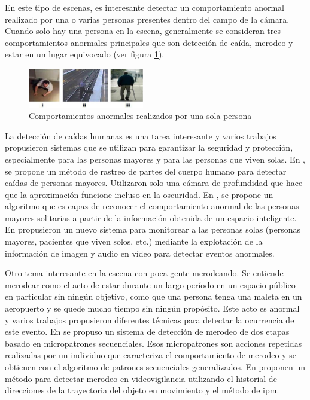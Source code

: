 En este tipo de escenas, es interesante detectar un comportamiento anormal realizado por una o varias personas presentes dentro del campo de la cámara. Cuando solo hay una persona en la escena, generalmente se consideran tres comportamientos anormales principales que son detección de caída, merodeo y estar en un lugar equivocado (ver figura \ref{fig:abnormal-behaviors-single-person}).

\begin{figure}[ht]
\centering
\includegraphics[width=0.45\textwidth]{img/chapters/estado-del-arte/Abnormal-behaviors-single-person.jpg}
\caption{\label{fig:abnormal-behaviors-single-person}Comportamientos anormales realizados por una sola persona}
\end{figure}

La detección de caídas humanas es una tarea interesante y varios trabajos propusieron sistemas que se utilizan para garantizar la seguridad y protección, especialmente para las personas mayores y para las personas que viven solas. En \cite{6804646}, se propone un método de rastreo de partes del cuerpo humano para detectar caídas de personas mayores. Utilizaron solo una cámara de profundidad que hace que la aproximación funcione incluso en la oscuridad. En \cite{HUANG2014125}, se propone un algoritmo que es capaz de reconocer el comportamiento anormal de las personas mayores solitarias a partir de la información obtenida de un espacio inteligente. En \cite{6916753} propusieron un nuevo sistema para monitorear a las personas solas (personas mayores, pacientes que viven solos, etc.) mediante la explotación de la información de imagen y audio en vídeo para detectar eventos anormales.

Otro tema interesante en la escena con poca gente merodeando. Se entiende merodear como el acto de estar durante un largo período en un espacio público en particular sin ningún objetivo, como que una persona tenga una maleta en un aeropuerto y se quede mucho tiempo sin ningún propósito. Este acto es anormal y varios trabajos propusieron diferentes técnicas para detectar la ocurrencia de este evento. En \cite{10.1007/978-3-319-18914-7_54} se propuso un sistema de detección de merodeo de dos etapas basado en micropatrones secuenciales. Esos micropatrones son acciones repetidas realizadas por un individuo que caracteriza el comportamiento de merodeo y se obtienen con el algoritmo de patrones secuenciales generalizados. En \cite{6959931} proponen un método para detectar merodeo en videovigilancia utilizando el historial de direcciones de la trayectoria del objeto en movimiento y el método de \gls{ipm}.

